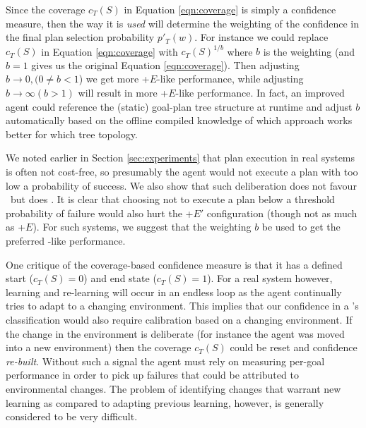 Since the
coverage $c_T(S)$ in Equation \ref{eqn:coverage} is simply a
confidence measure, then the way it is \textit{used} will determine
the weighting of the confidence in the final plan selection
probability $p'_T(w)$. For instance we could replace $c_T(S)$ in
Equation \ref{eqn:coverage} with $c_T(S)^{1/b}$ where $b$ is the
weighting (and $b=1$ gives us the original Equation
\ref{eqn:coverage}). Then adjusting $b \rightarrow 0, (0 \ne b < 1$)
we get more \BUL+$E$-like performance, while adjusting $b \rightarrow
\infty (b > 1)$ will result in more \CL+$E$-like performance. In fact,
an improved agent could reference the (static) goal-plan tree
structure at runtime and adjust $b$ automatically based on the offline
compiled knowledge of which approach works better for which tree
topology. 

We noted earlier in Section \ref{sec:experiments} that plan execution
in real systems is often not cost-free, so presumably the agent would
not execute a plan with too low a probability of success. We also show
that such deliberation does not favour \CL\ but does \BUL. It is clear
that choosing not to execute a plan below a threshold probability of
failure would also hurt the \CL+$E'$ configuration (though
not as much as \CL+$E$). For such systems, we suggest that the
weighting $b$ be used to get the preferred \BUL-like performance. 

One critique of the coverage-based confidence measure is that it has a
defined start ($c_T(S)=0$) and end state ($c_T(S)=1$). For a real
system however, learning and re-learning will occur in an endless loop
as the agent continually tries to adapt to a changing
environment. This implies that our confidence in a \dt's
classification would also require calibration based on a changing
environment. If the change in the environment is deliberate (for
instance the agent was moved into a new environment) then the coverage
$c_T(S)$ could be reset and confidence \textit{re-built}. Without such
a signal the agent must rely on measuring per-goal performance in
order to pick up failures that could be attributed to environmental
changes. The problem of identifying changes that warrant new learning
as compared to adapting previous learning, however, is generally
considered to be very difficult.


